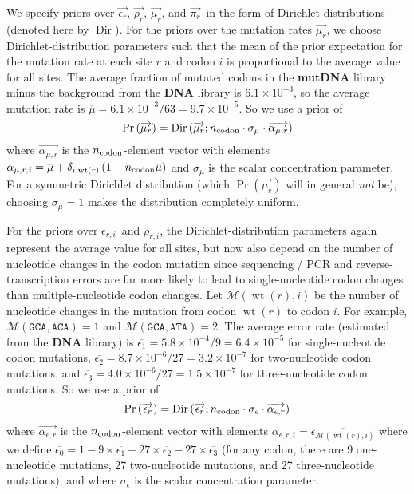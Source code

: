 \documentclass[12pt,draft]{article}
\DeclareMathOperator{\dirichlet}{Dir}
\DeclareMathOperator{\wt}{wt}
\newcommand{\ncodon}{\mbox{$n_{\rm{codon}}$}}
\newcommand{\eri}{\mbox{$\epsilon_{r,i}$}}
\newcommand{\ervec}{\mbox{$\overrightarrow{\epsilon_{r}}$}}
\newcommand{\rri}{\mbox{$\rho_{r,i}$}}
\newcommand{\rrvec}{\mbox{$\overrightarrow{\rho_{r}}$}}
\newcommand{\mrvec}{\mbox{$\overrightarrow{\mu_{r}}$}}
\newcommand{\pirvec}{\mbox{$\overrightarrow{\pi_r}$}}
\begin{document}
We specify priors over \ervec, \rrvec, \mrvec, and \pirvec\ in the form of Dirichlet distributions (denoted here by $\dirichlet$). For the priors over the mutation rates \mrvec, we choose Dirichlet-distribution parameters such that the mean of the prior expectation for the mutation rate at each site $r$ and codon $i$ is proportional to the average value for all sites. The average fraction of mutated codons in the {\bf mutDNA} library minus the background from the {\bf DNA} library is $6.1 \times 10^{-3}$, so the average mutation rate is $\overline{\mu} = 6.1 \times 10^{-3} / 63 = 9.7 \times 10^{-5}$. So we use a prior of
\begin{equation}
\Pr\left(\mrvec\right) = \dirichlet\left(\mrvec; \ncodon \cdot \sigma_{\mu} \cdot \overrightarrow{\alpha_{\mu,r}}\right)
\end{equation}
where $\overrightarrow{\alpha_{\mu,r}}$ is the \ncodon-element vector with elements $\alpha_{\mu,r,i} = \overline{\mu} + \delta_{i,\wt\left(r\right)}\left(1 - \ncodon\overline{\mu} \right)$ and $\sigma_{\mu}$ is the scalar concentration parameter. For a symmetric Dirichlet distribution (which $\Pr\left(\mrvec\right)$ will in general {\em not} be), choosing $\sigma_{\mu} = 1$ makes the distribution completely uniform. 

For the priors over \eri\ and \rri, the Dirichlet-distribution parameters again represent the average value for all sites, but now also depend on the number of nucleotide changes in the codon mutation since sequencing / PCR and reverse-transcription errors are far more likely to lead to single-nucleotide codon changes than multiple-nucleotide codon changes. Let $\mathcal{M}\left(\wt\left(r\right), i\right)$ be the number of nucleotide changes in the mutation from codon $\wt\left(r\right)$ to codon $i$. For example, $\mathcal{M}\left(\texttt{GCA}, \texttt{ACA}\right) = 1$ and $\mathcal{M}\left(\texttt{GCA}, \texttt{ATA}\right) = 2$. The average error rate (estimated from the {\bf DNA} library) is $\overline{\epsilon_1} = 5.8\times 10^{-4} / 9 = 6.4\times 10^{-5}$ for single-nucleotide codon mutations, $\overline{\epsilon_2} = 8.7\times 10^{-6} / 27 = 3.2\times 10^{-7}$ for two-nucleotide codon mutations, and $\overline{\epsilon_3} = 4.0\times 10^{-6} / 27 = 1.5\times 10^{-7}$ for three-nucleotide codon mutations. So we use a prior of
\begin{equation}
\Pr\left(\ervec\right) = \dirichlet\left(\ervec; \ncodon \cdot \sigma_{\epsilon} \cdot \overrightarrow{\alpha_{\epsilon,r}}\right)
\end{equation}
where $\overrightarrow{\alpha_{\epsilon,r}}$ is the \ncodon-element vector with elements $\alpha_{\epsilon,r,i} = \overline{\epsilon_{\mathcal{M}\left(\wt\left(r\right), i\right)}}$ where we define $\overline{\epsilon_0} = 1 - 9 \times \overline{\epsilon_1} - 27 \times \overline{\epsilon_2} - 27 \times \overline{\epsilon_3}$ (for any codon, there are 9 one-nucleotide mutations, 27 two-nucleotide mutations, and 27 three-nucleotide mutations), and where $\sigma_{\epsilon}$ is the scalar concentration parameter.
\end{document}
